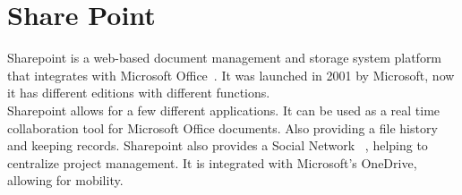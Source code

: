 \section{Share Point}

Sharepoint is a web-based document management and storage system platform that 
integrates with Microsoft Office~\cite{www-hid-sp18-601-spoint-website}. It was
 launched in 2001 by Microsoft, now it 
has different editions with different functions.\\

Sharepoint allows for a few different applications. It can be used as a real 
time collaboration tool for Microsoft Office documents. Also providing a 
file history and keeping records. Sharepoint also provides a Social Network 
~\cite{www-hid-sp18-601-spoint-new-sharepoint}, 
helping to centralize project management. It is integrated with Microsoft's 
OneDrive, allowing for mobility.\\